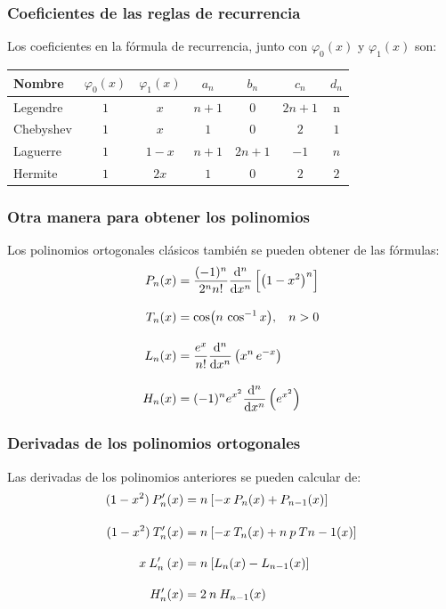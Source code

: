 \documentclass[12pt]{beamer}
\begin{document}
\begin{frame}
\frametitle{Coeficientes de las reglas de recurrencia}
Los coeficientes en la fórmula de recurrencia, junto con $\varphi_{0} (x)$ y $\varphi_{1} (x)$ son:
\pause
\begin{table}
\centering
\fontsize{12}{12}\selectfont
\begin{tabular}{| l | c | c | c | c | c | c |}
\hline
Nombre & $\varphi_{0}(x)$ & $\varphi_{1}(x)$ & $a_{n}$ & $b_{n}$ & $c_{n}$ & $d_{n}$ \\ \hline
Legendre & $1$ & $x$ & $n+1$ & $0$ & $2n+1$ & n \\
Chebyshev & $1$ & $x$ & $1$ & $0$ & $2$ & $1$ \\
Laguerre & $1$ & $1-x$ & $n+1$ & $2n+1$ & $-1$ & $n$ \\
Hermite & $1$ & $2x$ & $1$ & $0$ & $2$ & $2$ \\ \hline
\end{tabular}
\end{table}
\end{frame}
\begin{frame}
\frametitle{Otra manera para obtener los polinomios}
Los polinomios ortogonales clásicos también se pueden obtener de las fórmulas:
\pause
\begin{align*}
P_{n} (x) &= \dfrac{(-1)^{n}}{2^{n}n!} \dv[n]{x} \left[ \left( 1 - x^{2} \right)^{n} \right] \\[1em]
T_{n} (x) &= \cos(n \, \cos^{-1} x), \hspace{0.3cm} n > 0 \\[1em]
L_{n} (x) &= \dfrac{e^{x}}{n!} \dv[n]{x} \left( x^{n} \, e^{-x} \right) \\[1em]
H_{n} (x) &= (-1)^{n} e^{x^{2}} \dv[n]{x} \left(e^{x^{2}} \right)
\end{align*}
\end{frame}
\begin{frame}
\frametitle{Derivadas de los polinomios ortogonales}
Las derivadas de los polinomios anteriores se pueden calcular de:
\pause
\begin{align*}
(1 - x^{2}) \: {P}^{\prime}_{n} (x) &= n \: [ -x \: P_{n} (x) + P_{n - 1} (x) ] \\[1em]
(1 - x^{2}) \: {T}^{\prime}_{n} (x) &= n \: [-x \: T_{n} (x) + n \: p \: T{n - 1} (x) ] \\[1em]
x \: {L}^{\prime}_{n} \: (x) &= n \: [ L_{n} (x) - L_{n - 1} (x) ] \\[1em]
{H}^{\prime}_{n} (x) &= 2 \: n \:  H_{n - 1} (x)
\end{align*}
\end{frame}
\end{document}
